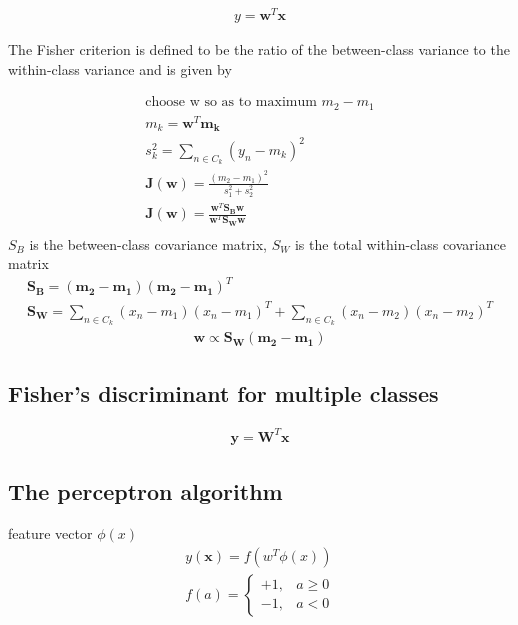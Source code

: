 \documentclass[a4paper]{article}
\begin{document}
\begin{align}
y = \mathbf{w}^T \mathbf{x}
\end{align}

The Fisher criterion is defined to be the ratio of the between-class variance to
 the within-class variance and is given by

\begin{align}
\text{choose w so as to maximum } m_2 - m_1\\
m_k = \mathbf{w}^T \mathbf{m_k}\\
s_k^2 = \displaystyle\sum_{n \in C_k}(y_n - m_k)^2\\
\mathbf{J}(\mathbf{w}) = \frac{(m_2 - m_1)^2}{s_1^2+s_2^2}\\
\mathbf{J}(\mathbf{w}) = \frac{\mathbf{w}^T \mathbf{S_B} \mathbf{w}}
  {\mathbf{w}^T \mathbf{S_W} \mathbf{w}}
\\
\end{align}
$S_B$ is the between-class covariance matrix,
 $S_W$ is the total within-class covariance matrix
\begin{align}
\mathbf{S_B} = (\mathbf{m_2} - \mathbf{m_1})(\mathbf{m_2} - \mathbf{m_1})^T\\
\mathbf{S_W} = \displaystyle\sum_{n \in C_k}(x_n - m_1) (x_n - m_1)^T +
\displaystyle\sum_{n \in C_k}(x_n - m_2) (x_n - m_2)^T
\end{align}
\begin{align}
\mathbf{w} \propto  \mathbf{S_W} (\mathbf{m_2} - \mathbf{m_1})
\end{align}

\subsection{Fisher’s discriminant for multiple classes}
\begin{align}
\mathbf{y} = \mathbf{W}^T \mathbf{x}
\end{align}

\subsection{The perceptron algorithm}
feature vector $\phi(x)$
\begin{align}
y(\mathbf{x}) = f(w^T\phi(x))\\
f(a) =
  \begin{cases}
   +1, & a \geq 0 \\
   -1, & a < 0
  \end{cases}
\end{align}
\end{document}
